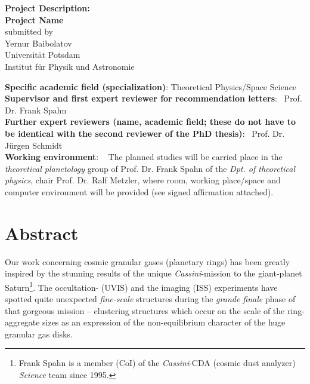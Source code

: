 \documentclass[11pt, notitlepage]{article} %
\begin{document}

\begin{center}
{\Large \textbf{Project Description:}}\\  
\vspace{.5cm}
{\LARGE\textbf{Project Name}} 
\\[.75cm] 
submitted by\\
{Yernur Baibolatov\\
Universit\"at Potsdam\\
Institut f\"ur Physik und Astronomie}
\end{center}
\noindent\textbf{Specific academic field (specialization)}:  Theoretical Physics/Space Science
\\[.75cm] 
\textbf{Supervisor and first expert reviewer for recommendation letters}: \,  Prof. Dr. Frank Spahn
\\[.75cm] 
\textbf{Further expert reviewers (name, academic field; these do not have to be identical with the second reviewer of the PhD thesis)}: \, Prof. Dr. J\"urgen Schmidt \,
\\[.75cm] 
\textbf{Working environment}: ~ The planned studies  will be carried place in the \emph{theoretical planetology} group of Prof. Dr. Frank Spahn of the  \emph{Dpt. 
of theoretical physics}, chair Prof. Dr. Ralf Metzler, where room, working place/space and computer environment will be provided (see signed affirmation attached).

\newpage
\section*{Abstract}

Our work concerning cosmic granular gases (planetary rings) has been greatly inspired by the stunning results of the unique  
\emph{Cassini}-mission to the giant-planet Saturn\footnote{Frank Spahn is a member (CoI) of the \emph{Cassini}-CDA (cosmic dust analyzer)
\emph{Science} team since 1995.}. The occultation- (UVIS) and the imaging (ISS) experiments have spotted quite unexpected 
\emph{fine-scale} structures during the \emph{grande finale} phase of that gorgeous mission -- 
clustering structures which occur on the scale of the ring-aggregate sizes as an expression 
of the non-equilibrium character of the huge granular gas disks.\\
\end{document}
